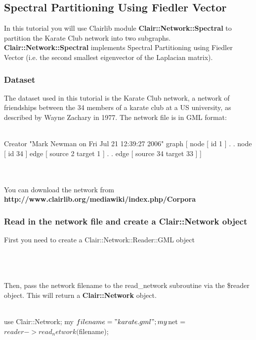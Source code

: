 \subsection{Spectral Partitioning Using Fiedler Vector}
In this tutorial you will use Clairlib module \textbf{Clair::Network::Spectral} to partition the Karate Club network into two subgraphs. \textbf{Clair::Network::Spectral} implements Spectral Partitioning using Fiedler Vector (i.e. the second smallest eigenvector of the Laplacian matrix).

\subsubsection{Dataset}

The dataset used in this tutorial is the Karate Club network, a network of friendships between the 34 members of a karate club at a US university, as described by Wayne Zachary in 1977. The network file is in GML format:
\\
\\
\begin{boxedverbatim}
 Creator "Mark Newman on Fri Jul 21 12:39:27 2006"
 graph
 [
   node
   [
     id 1
   ]
   .
   .
   node
   [
     id 34
   ]
   edge
   [
     source 2
     target 1
   ]
   .
   .
   edge
   [
     source 34
     target 33
   ]
 ]
\end{boxedverbatim}
\\
\\
You can download the network from \textbf{http://www.clairlib.org/mediawiki/index.php/Corpora}

\subsubsection{Read in the network file and create a Clair::Network object}

First you need to create a Clair::Network::Reader::GML object
\\
\\
\\
\\
Then, pass the network filename to the read\_network subroutine via the \$reader object. This will return a \textbf{Clair::Network} object.
\\
\\
\begin{boxedverbatim}
 use Clair::Network;
 my $filename = "karate.gml";
 my $net = $reader->read_network($filename);
\end{boxedverbatim}
\\
\\
